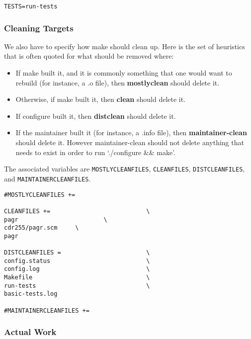 \documentclass[11pt]{article}
\begin{document}
\begin{verbatim}
TESTS=run-tests
\end{verbatim}
\subsubsection{Cleaning Targets}
\label{sec:orgb74e40b}
We also have to specify how make should clean up. Here is the set of heuristics
that is often quoted for what should be removed where:

\begin{itemize}
\item If make built it, and it is commonly something that one would want to
rebuild (for instance, a .o file), then \textbf{mostlyclean} should delete it.
\item Otherwise, if make built it, then \textbf{clean} should delete it.
\item If configure built it, then \textbf{distclean} should delete it.
\item If the maintainer built it (for instance, a .info file), then
\textbf{maintainer-clean} should delete it. However maintainer-clean should not
delete anything that needs to exist in order to run ‘./configure \&\& make’.
\end{itemize}


The associated variables are \texttt{MOSTLYCLEANFILES}, \texttt{CLEANFILES}, \texttt{DISTCLEANFILES},
and \texttt{MAINTAINERCLEANFILES}.
\begin{verbatim}
#MOSTLYCLEANFILES +=                    

CLEANFILES +=                           \
pagr                        \
cdr255/pagr.scm     \
pagr

DISTCLEANFILES =                        \
config.status                           \
config.log                              \
Makefile                                \
run-tests                               \
basic-tests.log

#MAINTAINERCLEANFILES +=                 

\end{verbatim}
\subsubsection{Actual Work}
\label{sec:orgb6db9fa}
\end{document}
